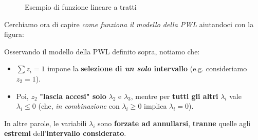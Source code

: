 \begin{figure}[!ht]
    \caption{Esempio di funzione lineare a tratti}
    \label{fig:04_07_FunzionePWL}
\end{figure}

Cerchiamo ora di capire \textit{come funziona il modello della PWL}
aiutandoci con la figura:

\begin{remark}
    Osservando il modello della PWL definito sopra, notiamo che:
    \begin{itemize}
        \item $\sum z_i = 1$ impone la \textbf{selezione di \textit{un solo} intervallo} 
            (e.g. consideriamo $z_{2}=1$).
        \item Poi, $z_{2}$ \textbf{"lascia accesi" solo} $\lambda_{2}$ e $\lambda_{3}$,
            mentre per \textbf{tutti gli altri} $\lambda_i$ vale $\lambda_i \le 0$
            (che, \textit{in combinazione} con $\lambda_i \ge 0$ implica $\lambda_i=0$).
    \end{itemize}
    In altre parole, le variabili $\lambda_i$ sono \textbf{forzate ad annullarsi},
    \textbf{tranne} quelle agli \textbf{estremi} dell'\textbf{intervallo considerato}.
\end{remark}

